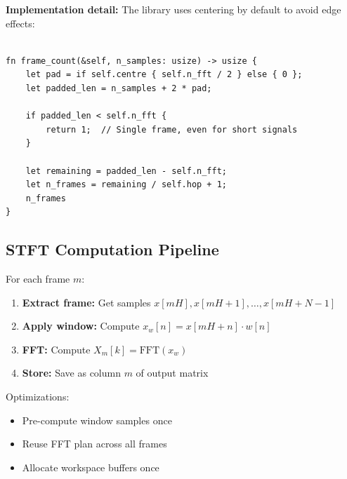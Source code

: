 \textbf{Implementation detail:} The library uses centering by default
to avoid edge effects:

\begin{lstlisting}[caption={Frame count with optional centre-padding}]

fn frame_count(&self, n_samples: usize) -> usize {
    let pad = if self.centre { self.n_fft / 2 } else { 0 };
    let padded_len = n_samples + 2 * pad;

    if padded_len < self.n_fft {
        return 1;  // Single frame, even for short signals
    }

    let remaining = padded_len - self.n_fft;
    let n_frames = remaining / self.hop + 1;
    n_frames
}
\end{lstlisting}

\subsection{STFT Computation Pipeline}

For each frame $m$:

\begin{enumerate}
  \item \textbf{Extract frame:} Get samples $x[mH], x[mH+1], \ldots, x[mH+N-1]$
  \item \textbf{Apply window:} Compute $x_w[n] = x[mH + n] \cdot w[n]$
  \item \textbf{FFT:} Compute $X_m[k] = \text{FFT}(x_w)$
  \item \textbf{Store:} Save as column $m$ of output matrix
\end{enumerate}

Optimizations:
\begin{itemize}
  \item Pre-compute window samples once
  \item Reuse FFT plan across all frames
  \item Allocate workspace buffers once
\end{itemize}

